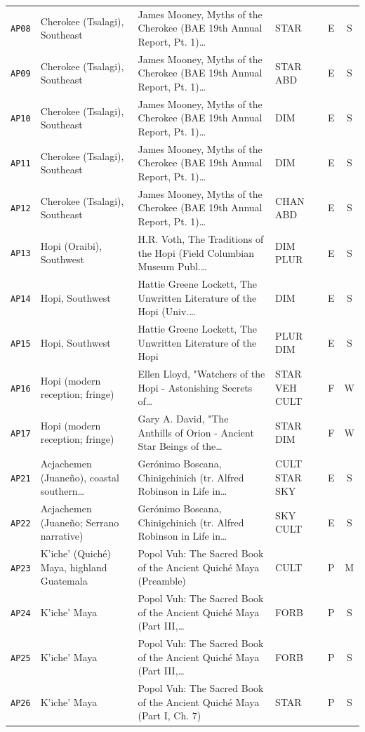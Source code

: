 \documentclass[11pt,a4paper]{article}
\begin{document}
\begin{longtable}{@{}p{1.6cm}p{3.6cm}p{6.9cm}p{2.1cm}cc@{}}
\texttt{AP08} & Cherokee (Tsalagi), Southeast & James Mooney, Myths of the Cherokee (BAE 19th Annual Report, Pt. 1)… & STAR & E & S \\
\texttt{AP09} & Cherokee (Tsalagi), Southeast & James Mooney, Myths of the Cherokee (BAE 19th Annual Report, Pt. 1)… & STAR ABD & E & S \\
\texttt{AP10} & Cherokee (Tsalagi), Southeast & James Mooney, Myths of the Cherokee (BAE 19th Annual Report, Pt. 1)… & DIM & E & S \\
\texttt{AP11} & Cherokee (Tsalagi), Southeast & James Mooney, Myths of the Cherokee (BAE 19th Annual Report, Pt. 1)… & DIM & E & S \\
\texttt{AP12} & Cherokee (Tsalagi), Southeast & James Mooney, Myths of the Cherokee (BAE 19th Annual Report, Pt. 1)… & CHAN ABD & E & S \\
\texttt{AP13} & Hopi (Oraibi), Southwest & H.R. Voth, The Traditions of the Hopi (Field Columbian Museum Publ.… & DIM PLUR & E & S \\
\texttt{AP14} & Hopi, Southwest & Hattie Greene Lockett, The Unwritten Literature of the Hopi (Univ.… & DIM & E & S \\
\texttt{AP15} & Hopi, Southwest & Hattie Greene Lockett, The Unwritten Literature of the Hopi & PLUR DIM & E & S \\
\texttt{AP16} & Hopi (modern reception; fringe) & Ellen Lloyd, "Watchers of the Hopi - Astonishing Secrets of… & STAR VEH CULT & F & W \\
\texttt{AP17} & Hopi (modern reception; fringe) & Gary A. David, "The Anthills of Orion - Ancient Star Beings of the… & STAR DIM & F & W \\
\texttt{AP21} & Acjachemen (Juaneño), coastal southern… & Gerónimo Boscana, Chinigchinich (tr. Alfred Robinson in Life in… & CULT STAR SKY & E & S \\
\texttt{AP22} & Acjachemen (Juaneño; Serrano narrative) & Gerónimo Boscana, Chinigchinich (tr. Alfred Robinson in Life in… & SKY CULT & E & S \\
\texttt{AP23} & K'iche' (Quiché) Maya, highland Guatemala & Popol Vuh: The Sacred Book of the Ancient Quiché Maya (Preamble) & CULT & P & M \\
\texttt{AP24} & K'iche' Maya & Popol Vuh: The Sacred Book of the Ancient Quiché Maya (Part III,… & FORB & P & S \\
\texttt{AP25} & K'iche' Maya & Popol Vuh: The Sacred Book of the Ancient Quiché Maya (Part III,… & FORB & P & S \\
\texttt{AP26} & K'iche' Maya & Popol Vuh: The Sacred Book of the Ancient Quiché Maya (Part I, Ch. 7) & STAR & P & S \\

\end{longtable}
\end{document}

